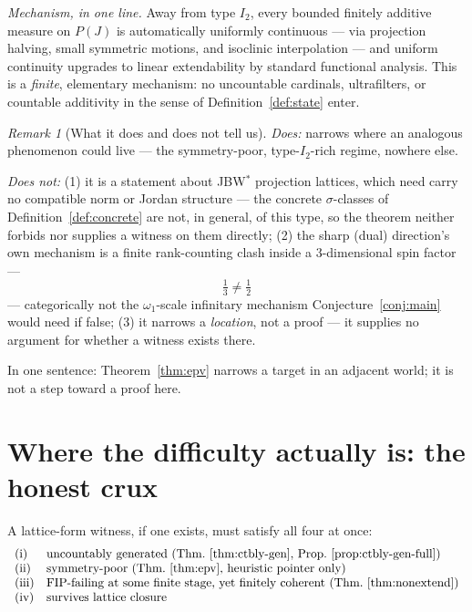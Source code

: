 \documentclass[11pt]{article}
\theoremstyle{remark}
\newtheorem{remark}[theorem]{Remark}
\begin{document}
\emph{Mechanism, in one line.} Away from type $I_2$, every bounded finitely
additive measure on $P(J)$ is automatically uniformly continuous — via
projection halving, small symmetric motions, and isoclinic interpolation —
and uniform continuity upgrades to linear extendability by standard
functional analysis. This is a \emph{finite}, elementary mechanism: no
uncountable cardinals, ultrafilters, or countable additivity in the sense of
Definition~\ref{def:state} enter.

\begin{remark}[What it does and does not tell us]
\label{rem:epv-scope}
\emph{Does:} narrows where an analogous phenomenon could live — the
symmetry-poor, type-$I_2$-rich regime, nowhere else.

\emph{Does not:} (1) it is a statement about JBW$^\ast$ projection lattices,
which need carry no compatible norm or Jordan structure — the concrete
$\sigma$-classes of Definition~\ref{def:concrete} are not, in general, of
this type, so the theorem neither forbids nor supplies a witness on them
directly; (2) the sharp (dual) direction's own mechanism is a finite
rank-counting clash inside a $3$-dimensional spin factor —
\[
  \tfrac13 \ne \tfrac12
\]
— categorically not the $\omega_1$-scale infinitary mechanism
Conjecture~\ref{conj:main} would need if false; (3) it narrows a
\emph{location}, not a proof — it supplies no argument for whether a witness
exists there.
\end{remark}

In one sentence: Theorem~\ref{thm:epv} narrows a target in an adjacent world;
it is not a step toward a proof here.

\section{Where the difficulty actually is: the honest crux}

A lattice-form witness, if one exists, must satisfy all four at once:
\[
\begin{array}{ll}
\text{(i)} & \text{uncountably generated (Thm.~\ref{thm:ctbly-gen}, Prop.~\ref{prop:ctbly-gen-full})}\\
\text{(ii)} & \text{symmetry-poor (Thm.~\ref{thm:epv}, heuristic pointer only)}\\
\text{(iii)} & \text{FIP-failing at some finite stage, yet finitely coherent (Thm.~\ref{thm:nonextend})}\\
\text{(iv)} & \text{survives lattice closure}
\end{array}
\]
\end{document}
